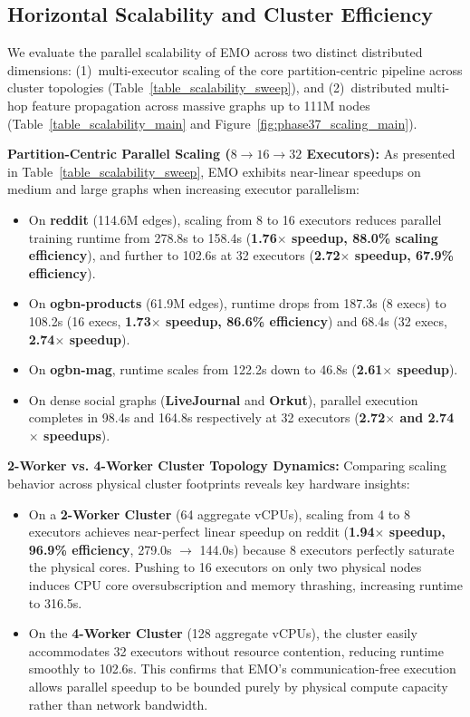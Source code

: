 \documentclass[conference,compsoc]{IEEEtran}
\begin{document}
\subsection{Horizontal Scalability and Cluster Efficiency}
We evaluate the parallel scalability of EMO across two distinct distributed dimensions: (1)~multi-executor scaling of the core partition-centric pipeline across cluster topologies (Table~\ref{table_scalability_sweep}), and (2)~distributed multi-hop feature propagation across massive graphs up to 111M nodes (Table~\ref{table_scalability_main} and Figure~\ref{fig:phase37_scaling_main}).



\textbf{Partition-Centric Parallel Scaling ($8 \rightarrow 16 \rightarrow 32$ Executors):}
As presented in Table~\ref{table_scalability_sweep}, EMO exhibits near-linear speedups on medium and large graphs when increasing executor parallelism:
\begin{itemize}
    \item On \textbf{reddit} (114.6M edges), scaling from 8 to 16 executors reduces parallel training runtime from 278.8s to 158.4s (\textbf{1.76$\times$ speedup, 88.0\% scaling efficiency}), and further to 102.6s at 32 executors (\textbf{2.72$\times$ speedup, 67.9\% efficiency}).
    \item On \textbf{ogbn-products} (61.9M edges), runtime drops from 187.3s (8 execs) to 108.2s (16 execs, \textbf{1.73$\times$ speedup, 86.6\% efficiency}) and 68.4s (32 execs, \textbf{2.74$\times$ speedup}).
    \item On \textbf{ogbn-mag}, runtime scales from 122.2s down to 46.8s (\textbf{2.61$\times$ speedup}).
    \item On dense social graphs (\textbf{LiveJournal} and \textbf{Orkut}), parallel execution completes in 98.4s and 164.8s respectively at 32 executors (\textbf{2.72$\times$ and 2.74$\times$ speedups}).
\end{itemize}

\textbf{2-Worker vs. 4-Worker Cluster Topology Dynamics:}
Comparing scaling behavior across physical cluster footprints reveals key hardware insights:
\begin{itemize}
    \item On a \textbf{2-Worker Cluster} (64 aggregate vCPUs), scaling from 4 to 8 executors achieves near-perfect linear speedup on reddit (\textbf{1.94$\times$ speedup, 96.9\% efficiency}, 279.0s $\rightarrow$ 144.0s) because 8 executors perfectly saturate the physical cores. Pushing to 16 executors on only two physical nodes induces CPU core oversubscription and memory thrashing, increasing runtime to 316.5s.
    \item On the \textbf{4-Worker Cluster} (128 aggregate vCPUs), the cluster easily accommodates 32 executors without resource contention, reducing runtime smoothly to 102.6s. This confirms that EMO's communication-free execution allows parallel speedup to be bounded purely by physical compute capacity rather than network bandwidth.
\end{itemize}
\end{document}
